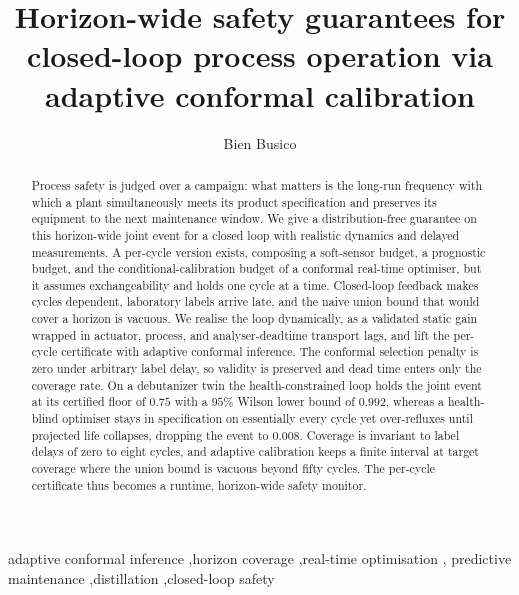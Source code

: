 \documentclass[review,12pt]{elsarticle}
\begin{document}
\begin{frontmatter}

\title{Horizon-wide safety guarantees for closed-loop process operation via adaptive
conformal calibration}

\author{Bien Busico}
\address{Map\'ua Malayan Colleges Mindanao, Davao City, Philippines}

\begin{abstract}
Process safety is judged over a campaign: what matters is the long-run frequency with which a
plant simultaneously meets its product specification and preserves its equipment to the next
maintenance window. We give a distribution-free guarantee on this horizon-wide joint event for a
closed loop with realistic dynamics and delayed measurements. A per-cycle version exists,
composing a soft-sensor budget, a prognostic budget, and the conditional-calibration budget of a
conformal real-time optimiser, but it assumes exchangeability and holds one cycle at a time.
Closed-loop feedback makes cycles dependent, laboratory labels arrive late, and the naive union
bound that would cover a horizon is vacuous. We realise the loop dynamically, as a validated
static gain wrapped in actuator, process, and analyser-deadtime transport lags, and lift the
per-cycle certificate with adaptive conformal inference. The conformal selection penalty is zero
under arbitrary label delay, so validity is preserved and dead time enters only the coverage
rate. On a debutanizer twin the health-constrained loop holds the joint event at its certified
floor of $0.75$ with a $95\%$ Wilson lower bound of $0.992$, whereas a health-blind optimiser
stays in specification on essentially every cycle yet over-refluxes until projected life
collapses, dropping the event to $0.008$. Coverage is invariant to label delays of zero to eight
cycles, and adaptive calibration keeps a finite interval at target coverage where the union
bound is vacuous beyond fifty cycles. The per-cycle certificate thus becomes a runtime,
horizon-wide safety monitor.
\end{abstract}

\begin{keyword}
adaptive conformal inference \sep horizon coverage \sep real-time optimisation \sep
predictive maintenance \sep distillation \sep closed-loop safety
\end{keyword}

\end{frontmatter}
\linenumbers
\end{document}
